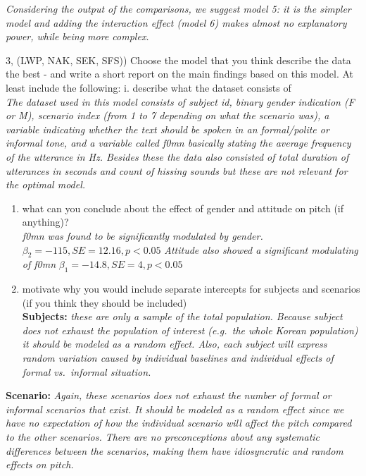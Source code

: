 \documentclass[
]{article}
\begin{document}
\emph{Considering the output of the comparisons, we suggest model 5: it
is the simpler model and adding the interaction effect (model 6) makes
almost no explanatory power, while being more complex.}

3, (LWP, NAK, SEK, SFS)) Choose the model that you think describe the
data the best - and write a short report on the main findings based on
this model. At least include the following: i. describe what the dataset
consists of\\
\emph{The dataset used in this model consists of subject id, binary
gender indication (F or M), scenario index (from 1 to 7 depending on
what the scenario was), a variable indicating whether the text should be
spoken in an formal/polite or informal tone, and a variable called f0mn
basically stating the average frequency of the utterance in Hz. Besides
these the data also consisted of total duration of utterances in seconds
and count of hissing sounds but these are not relevant for the optimal
model.}

\begin{enumerate}
\def\labelenumi{\roman{enumi}.}
\setcounter{enumi}{1}
\item
  what can you conclude about the effect of gender and attitude on pitch
  (if anything)?\\
  \emph{f0mn was found to be significantly modulated by gender.}
  \(\beta_2 = -115, SE = 12.16, p<0.05\) \emph{Attitude also showed a
  significant modulating of f0mn} \(\beta_1 = -14.8, SE = 4, p<0.05\)
\item
  motivate why you would include separate intercepts for subjects and
  scenarios (if you think they should be included)\\
  \textbf{Subjects:} \emph{these are only a sample of the total
  population. Because subject does not exhaust the population of
  interest (e.g.~the whole Korean population) it should be modeled as a
  random effect. Also, each subject will express random variation caused
  by individual baselines and individual effects of formal vs.~informal
  situation.}
\end{enumerate}

\textbf{Scenario:} \emph{Again, these scenarios does not exhaust the
number of formal or informal scenarios that exist. It should be modeled
as a random effect since we have no expectation of how the individual
scenario will affect the pitch compared to the other scenarios. There
are no preconceptions about any systematic differences between the
scenarios, making them have idiosyncratic and random effects on pitch.}
\end{document}
